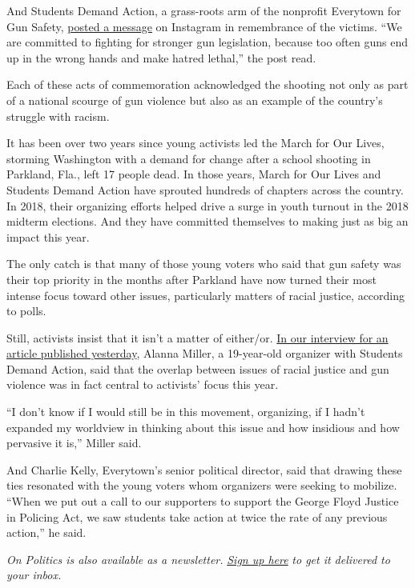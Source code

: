 And Students Demand Action, a grass-roots arm of the nonprofit Everytown
for Gun Safety, \href{https://www.instagram.com/p/CDbpUdzHq_L/}{posted a
message} on Instagram in remembrance of the victims. ``We are committed
to fighting for stronger gun legislation, because too often guns end up
in the wrong hands and make hatred lethal,'' the post read.

Each of these acts of commemoration acknowledged the shooting not only
as part of a national scourge of gun violence but also as an example of
the country's struggle with racism.

It has been over two years since young activists led the March for Our
Lives, storming Washington with a demand for change after a school
shooting in Parkland, Fla., left 17 people dead. In those years, March
for Our Lives and Students Demand Action have sprouted hundreds of
chapters across the country. In 2018, their organizing efforts helped
drive a surge in youth turnout in the 2018 midterm elections. And they
have committed themselves to making just as big an impact this year.

The only catch is that many of those young voters who said that gun
safety was their top priority in the months after Parkland have now
turned their most intense focus toward other issues, particularly
matters of racial justice, according to polls.

Still, activists insist that it isn't a matter of either/or.
\href{https://www.nytimes.com/2020/08/03/us/politics/gun-control-voters.html}{In
our interview for an article published yesterday}, Alanna Miller, a
19-year-old organizer with Students Demand Action, said that the overlap
between issues of racial justice and gun violence was in fact central to
activists' focus this year.

``I don't know if I would still be in this movement, organizing, if I
hadn't expanded my worldview in thinking about this issue and how
insidious and how pervasive it is,'' Miller said.

And Charlie Kelly, Everytown's senior political director, said that
drawing these ties resonated with the young voters whom organizers were
seeking to mobilize. ``When we put out a call to our supporters to
support the George Floyd Justice in Policing Act, we saw students take
action at twice the rate of any previous action,'' he said.

\emph{On Politics is also available as a newsletter.}
\href{https://www.nytimes.com/newsletters/politics}{\emph{Sign up here}}
\emph{to get it delivered to your inbox.}

